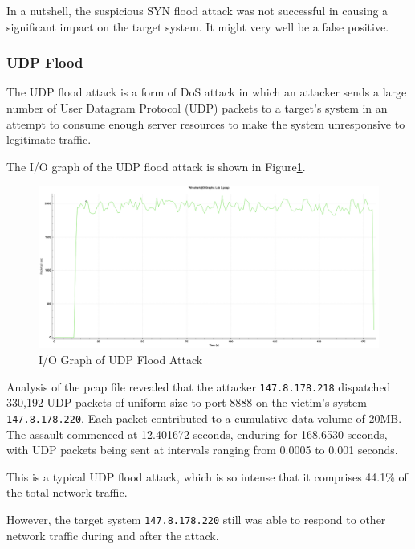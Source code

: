 \documentclass{article}
\begin{document}
    In a nutshell, the suspicious SYN flood attack was not successful in causing a significant impact on the target system.
    It might very well be a false positive.

    \subsubsection{UDP Flood}\label{subsubsec:udp-flood}
    The UDP flood attack is a form of DoS attack in which an attacker sends a large number of User Datagram Protocol (UDP) packets to a target's system in an attempt to consume enough server resources to make the system unresponsive to legitimate traffic.

    The I/O graph of the UDP flood attack is shown in Figure\ref{fig:udp-flood-io-graph}.

    \begin{figure}[H]
        \centering
        \includegraphics[width=\textwidth]{image/218_udp.png}
        \caption{I/O Graph of UDP Flood Attack}
        \label{fig:udp-flood-io-graph}
    \end{figure}

    Analysis of the pcap file revealed that the attacker \lstinline|147.8.178.218| dispatched 330,192 UDP packets of uniform size to port 8888 on the victim's system \lstinline|147.8.178.220|. 
    Each packet contributed to a cumulative data volume of 20MB. 
    The assault commenced at 12.401672 seconds, enduring for 168.6530 seconds, with UDP packets being sent at intervals ranging from 0.0005 to 0.001 seconds.

    This is a typical UDP flood attack, which is so intense that it comprises 44.1\% of the total network traffic.
    
    However, the target system \lstinline|147.8.178.220| still was able to respond to other network traffic during and after the attack.
\end{document}
